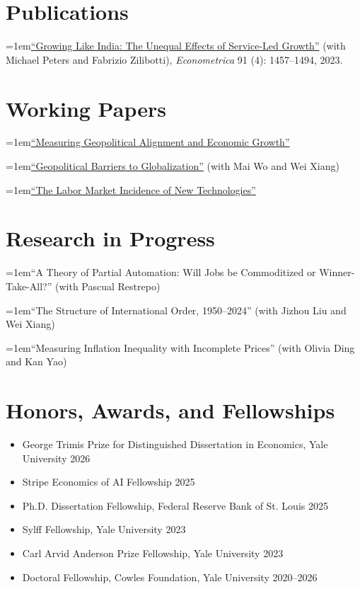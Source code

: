 \documentclass[10pt,letterpaper]{article}
\newcommand{\cvpaper}[1]{\par\addvspace{4pt}\begingroup\raggedright\hangindent=1em\hangafter=1\noindent #1\par\endgroup}
\begin{document}
\section*{Publications}

\cvpaper{\href{https://www.tianyu-fan.com/files/FPZ_UnequalGrowth.pdf}{``Growing Like India: The Unequal Effects of Service-Led Growth''} (with Michael Peters and Fabrizio Zilibotti), \textit{Econometrica} 91 (4): 1457--1494, 2023.}

\section*{Working Papers}

\cvpaper{\href{https://www.tianyu-fan.com/files/FAN_Tianyu_Geopolitical_Growth.pdf}{``Measuring Geopolitical Alignment and Economic Growth''}}
\cvpaper{\href{https://www.tianyu-fan.com/files/FWX_Geopolitical_Barriers.pdf}{``Geopolitical Barriers to Globalization''} (with Mai Wo and Wei Xiang)}
\cvpaper{\href{https://www.tianyu-fan.com/files/FAN_Technology_Incidence.pdf}{``The Labor Market Incidence of New Technologies''}}

\section*{Research in Progress}

\cvpaper{``A Theory of Partial Automation: Will Jobs be Commoditized or Winner-Take-All?'' (with Pascual Restrepo)}
\cvpaper{``The Structure of International Order, 1950--2024'' (with Jizhou Liu and Wei Xiang)}
\cvpaper{``Measuring Inflation Inequality with Incomplete Prices'' (with Olivia Ding and Kan Yao)}

\section*{Honors, Awards, and Fellowships}

\begin{itemize}[noitemsep, leftmargin=0.25in]
    \item George Trimis Prize for Distinguished Dissertation in Economics, Yale University \hfill 2026
    \item Stripe Economics of AI Fellowship \hfill 2025
    \item Ph.D. Dissertation Fellowship, Federal Reserve Bank of St. Louis \hfill 2025
    \item Sylff Fellowship, Yale University \hfill 2023
    \item Carl Arvid Anderson Prize Fellowship, Yale University \hfill 2023
    \item Doctoral Fellowship, Cowles Foundation, Yale University \hfill 2020--2026
\end{itemize}
\end{document}
